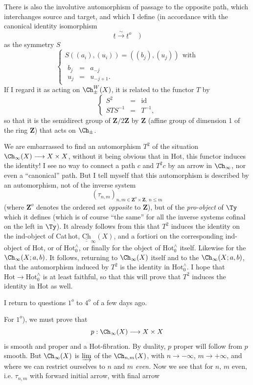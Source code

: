 There is also the involutive automorphism of passage to the opposite path, which interchanges source and target, and which I define (in accordance with the canonical identity isomorphism
\[
\underline{t} \xrightarrow{\sim} \underline{t}^o \quad )
\]
as the symmetry $S$
\[
\left\{ \begin{array}{l}
S((a_i),(u_i)) = ((b_j),(u_j)) \ \ \text{with} \\[1ex]
\begin{array}{lcl} b_j & = & a_{-j} \\[1ex] u_j & = & u_{-j+1}. \end{array}
\end{array} \right.
\]
If I regard it as acting on $\Ch^{W}_{\pm}(X)$, it is related to the functor $T$ by
\[
\left\{ \begin{array}{rcl}
S^2 & = & \mathrm{id} \\[1ex]
STS^{-1} & = & T^{-1},
\end{array} \right.
\]
so that it is the semidirect group of $\mathbf{Z}/2\mathbf{Z}$ by $\mathbf{Z}$ (affine group of dimension 1 of the ring $\mathbf{Z}$) that acts on $\Ch_{\pm}$.

We are embarrassed to find an automorphism $T^2$ of the situation $\Ch_{\infty}(X) \longrightarrow X \times X$, without it being obvious that in Hot, this functor induces the identity! I see no way to connect a path $c$ and $T^2 c$ by an arrow in $\Ch_{\infty}$, nor even a ``canonical'' path. But I tell myself that this automorphism is described by an automorphism, not of the inverse system %
\[
(\tau_{n,m})_{n,m \in \mathbf{Z}^o \times \mathbf{Z},\ n \leq m}
\]
(where $\mathbf{Z}^o$ denotes the ordered set \textit{opposite} to $\mathbf{Z}$), but of the \textit{pro-object} of $\Ty$ which it defines (which is of course ``the same'' for all the inverse systems cofinal on the left in $\Ty$). It already follows from this that $T^2$ induces the identity on the ind-object of Cat\,hot, $\underline{\underline{\mathrm{Ch}}}_{\infty}(X)$, and a fortiori on the corresponding ind-object of Hot, or of $\mathrm{Hot}^{\wedge}_{0}$, or finally for the object of $\mathrm{Hot}^{\wedge}_{0}$ itself. Likewise for the $\Ch_{\infty}(X; a, b)$. It follows, returning to $\Ch_{\infty}(X)$ itself and to the $\Ch_{\infty}(X; a, b)$, that the automorphism induced by $T^2$ is the identity in $\mathrm{Hot}^{\wedge}_{0}$. I hope that $\mathrm{Hot} \longrightarrow \mathrm{Hot}^{\wedge}_{0}$ is
at least faithful, so that this will prove that $T^2$ induces the identity in Hot as well.

I return to questions $1^o$ to $4^o$ of a few days ago.

For $1^o$), we must prove that
\[
p : \Ch_{\infty}(X) \longrightarrow X \times X
\]
is smooth and proper and a Hot-fibration. By duality, $p$ proper will follow from $p$ smooth. But $\Ch_{\infty}(X)$ is $\varinjlim$ of the $\Ch_{n,m}(X)$, with $n \longrightarrow -\infty$, $m \longrightarrow +\infty$, and where we can restrict ourselves to $n$ and $m$ \textit{even.} Now we see that for $n$, $m$ even, i.e. $\tau_{n,m}$ with forward initial arrow, with final arrow